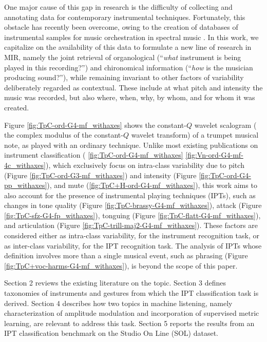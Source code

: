 One major cause of this gap in research is the difficulty of collecting and annotating data for contemporary instrumental techniques.
Fortunately, this obstacle has recently been overcome, owing to the creation of databases of instrumental samples for music orchestration in spectral music \cite{maresz2013cmr}.
In this work, we capitalize on the availability of this data to formulate a new line of research in MIR, namely the joint retrieval of organological (``\emph{what} instrument is being played in this recording?'') and chironomical information (``\emph{how} is the musician producing sound?''), while remaining invariant to other factors of variability deliberately regarded as contextual.
These include at what pitch and intensity the music was recorded, but also where, when, why, by whom, and for whom it was created.

Figure \ref{fig:TpC-ord-G4-mf_withaxes} shows the constant-$Q$ wavelet scalogram (\ie{} the complex modulus of the constant-$Q$ wavelet transform) of a trumpet musical note, as played with an ordinary technique.
Unlike most existing publications on instrument classification (\eg{} \ref{fig:TpC-ord-G4-mf_withaxes} \vs{} \ref{fig:Vn-ord-G4-mf-4c_withaxes}), which exclusively focus on intra-class variability due to pitch (Figure \ref{fig:TpC-ord-G3-mf_withaxes}) and intensity (Figure \ref{fig:TpC-ord-G4-pp_withaxes}), and mute (\ref{fig:TpC+H-ord-G4-mf_withaxes}), this work aims to also account for the presence of instrumental playing techniques (IPTs), such as changes in tone quality (Figure \ref{fig:TpC-brassy-G4-mf_withaxes}), attack (Figure \ref{fig:TpC-sfz-G4-fp_withaxes}), tonguing (Figure \ref{fig:TpC-flatt-G4-mf_withaxes}), and articulation (Figure \ref{fig:TpC-trill-maj2-G4-mf_withaxes}).
These factors are considered either as intra-class variability, for the instrument recognition task, or as inter-class variability, for the IPT recognition task.
The analysis of IPTs whose definition involves more than a single musical event, such as phrasing (Figure \ref{fig:TpC+voc-harms-G4-mf_withaxes}), is beyond the scope of this paper.

Section 2 reviews the existing literature on the topic.
Section 3 defines taxonomies of instruments and gestures from which the IPT classification task is derived.
Section 4 describes how two topics in machine listening, namely characterization of amplitude modulation and incorporation of supervised metric learning, are relevant to address this task.
Section 5 reports the results from an IPT classification benchmark on the Studio On Line (SOL) dataset.



